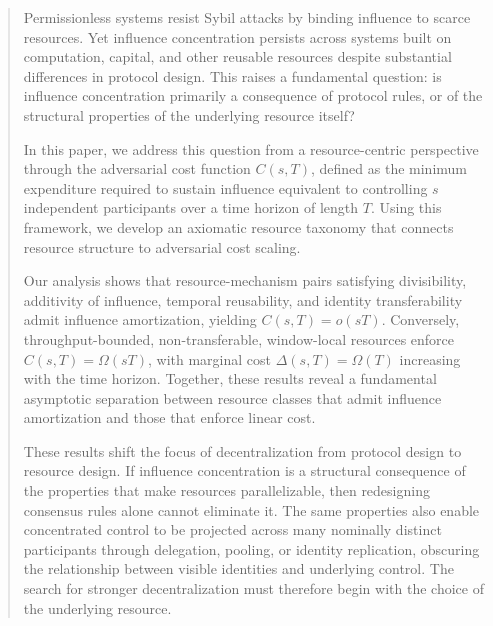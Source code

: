 \documentclass[manuscript,review]{acmart}
\theoremstyle{remark}
\begin{document}
	\begin{abstract}
		Permissionless systems resist Sybil attacks by binding influence
		to scarce resources. Yet influence concentration persists across
		systems built on computation, capital, and other reusable resources
		despite substantial differences in protocol design. This raises a
		fundamental question: is influence concentration primarily a
		consequence of protocol rules, or of the structural properties of
		the underlying resource itself?
		
		In this paper, we address this question from a resource-centric
		perspective through the adversarial cost function $C(s,T)$,
		defined as the minimum expenditure required to sustain
		influence equivalent to controlling $s$ independent
		participants over a time horizon of length $T$. Using this framework, we develop an axiomatic resource
		taxonomy that connects resource structure to adversarial cost
		scaling.
		
		Our analysis shows that resource-mechanism pairs satisfying
		divisibility, additivity of influence, temporal reusability, and
		identity transferability admit influence amortization, yielding
		$C(s,T)=o(sT)$. Conversely, throughput-bounded,
		non-transferable, window-local resources enforce
		$C(s,T)=\Omega(sT)$, with marginal cost
		$\Delta(s,T)=\Omega(T)$ increasing with the time horizon.
		Together, these results reveal a fundamental asymptotic
		separation between resource classes that admit influence
		amortization and those that enforce linear cost.
		
		These results shift the focus of decentralization from protocol
		design to resource design. If influence concentration is a
		structural consequence of the properties that make resources
		parallelizable, then redesigning consensus rules alone cannot
		eliminate it. The same properties also enable concentrated
		control to be projected across many nominally distinct
		participants through delegation, pooling, or identity
		replication, obscuring the relationship between visible
		identities and underlying control. The search for stronger
		decentralization must therefore begin with the choice of the
		underlying resource.
		
	\end{abstract}
	
	
	
	
\end{document}
